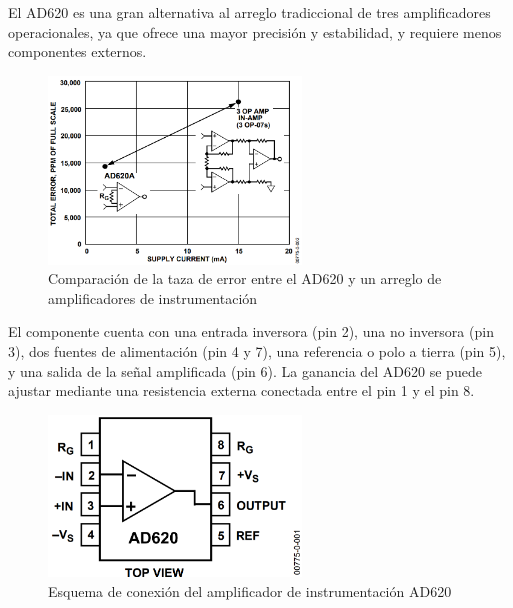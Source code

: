             El AD620 es una gran alternativa al arreglo tradiccional de tres amplificadores operacionales, ya que ofrece una mayor precisión y estabilidad, y requiere menos componentes externos. 

            \begin{figure}[H]
                \centering
                \includegraphics[width=0.6\textwidth]{img/Desarrollo/Amplificador_AD620_comparacion.png}
                \caption[Comparación de la taza de error entre el AD620 y un arreglo de amplificadores de instrumentación.]{Comparación de la taza de error entre el AD620 y un arreglo de amplificadores de instrumentación\footnotemark}
                \label{fig:Amplificador_AD620_comparacion}
            \end{figure}

            El componente cuenta con una entrada inversora (pin 2), una no inversora (pin 3), dos fuentes de alimentación (pin 4 y 7), una referencia o polo a tierra (pin 5), y una salida de la señal amplificada (pin 6). La ganancia del AD620 se puede ajustar mediante una resistencia externa conectada entre el pin 1 y el pin 8.
            \begin{figure}[H]
                \centering
                \includegraphics[width=0.6\textwidth]{img/Desarrollo/AD620_Diagrama.png}
                \caption[Esquema de conexión del amplificador de instrumentación AD620.]{Esquema de conexión del amplificador de instrumentación AD620\footnotemark}
                \label{fig:AD620_pinout}
            \end{figure}

